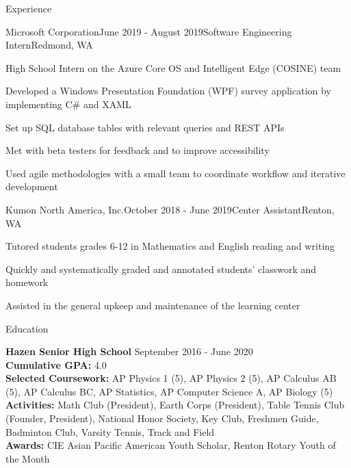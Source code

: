 \documentclass{resume} %
\begin{document}

\begin{rSection}{Experience}

\begin{rSubsection}{Microsoft Corporation}{June 2019 - August 2019}{Software Engineering Intern}{Redmond, WA}
\item High School Intern on the Azure Core OS and Intelligent Edge (COSINE) team
\item Developed a Windows Presentation Foundation (WPF) survey application by implementing C\# and XAML
\item Set up SQL database tables with relevant queries and REST APIs
\item Met with beta testers for feedback and to improve accessibility
\item Used agile methodologies with a small team to coordinate workflow and iterative development
\end{rSubsection}


\begin{rSubsection}{Kumon North America, Inc.}{October 2018 - June 2019}{Center Assistant}{Renton, WA}
\item Tutored students grades 6-12 in Mathematics and English reading and writing
\item Quickly and systematically graded and annotated students' classwork and homework
\item Assisted in the general upkeep and maintenance of the learning center
\end{rSubsection}

\end{rSection}


\begin{rSection}{Education}

{\bf Hazen Senior High School} \hfill {September 2016 - June 2020}\\
{\bf Cumulative GPA:} 4.0  \smallskip \\
{\bf Selected Coursework:} AP Physics 1 (5), AP Physics 2 (5), AP Calculus AB (5), AP Calculus BC, AP Statistics, AP Computer Science A, AP Biology (5)\\
{\bf Activities:} Math Club (President), Earth Corps (President), Table Tennis Club (Founder, President), National Honor Society, Key Club, Freshmen Guide, Badminton Club, Varsity Tennis, Track and Field\\
{\bf Awards:} CIE Asian Pacific American Youth Scholar, Renton Rotary Youth of the Month



\end{rSection}
\end{document}
